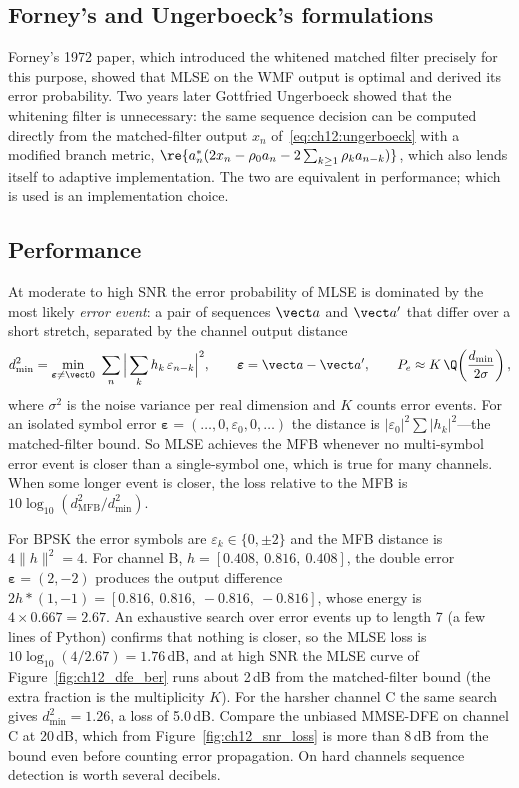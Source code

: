\subsection{Forney's and Ungerboeck's formulations}

Forney's 1972 paper, which introduced the whitened matched filter precisely for this purpose,
showed that MLSE on the WMF output is optimal and derived its error probability. Two years later
Gottfried Ungerboeck showed that the whitening filter is unnecessary: the same sequence decision can
be computed directly from the matched-filter output $x_n$ of~\eqref{eq:ch12:ungerboeck} with a modified
branch metric, $\re\{a_n^*(2x_n-\rho_0a_n-2\sum_{k\ge1}\rho_ka_{n-k})\}$, which also lends itself to
adaptive implementation. The two are equivalent in performance; which is used is an implementation
choice.

\subsection{Performance}

At moderate to high SNR the error probability of MLSE is dominated by the most likely
\emph{error event}: a pair of sequences $\vect a$ and $\vect a'$ that differ over a short stretch,
separated by the channel output distance
\begin{equation}
d^2_{\min}=\min_{\boldsymbol\varepsilon\ne\vect 0}\ \sum_n\Big|\sum_k h_k\,\varepsilon_{n-k}\Big|^2,
\qquad \boldsymbol\varepsilon=\vect a-\vect a',
\qquad P_e\approx K\,\Q\!\left(\frac{d_{\min}}{2\sigma}\right),
\label{eq:ch12:dmin}
\end{equation}
where $\sigma^2$ is the noise variance per real dimension and $K$ counts error events. For an
isolated symbol error $\boldsymbol\varepsilon=(\dots,0,\varepsilon_0,0,\dots)$ the distance is
$|\varepsilon_0|^2\sum|h_k|^2$---the matched-filter bound. So MLSE achieves the MFB whenever no
multi-symbol error event is closer than a single-symbol one, which is true for many channels. When
some longer event is closer, the loss relative to the MFB is $10\log_{10}(d^2_{\mathrm{MFB}}/d^2_{\min})$.

\begin{worked}
For BPSK the error symbols are $\varepsilon_k\in\{0,\pm2\}$ and the MFB distance is $4\|h\|^2=4$.
For channel B, $h=[0.408,\ 0.816,\ 0.408]$, the double error $\boldsymbol\varepsilon=(2,-2)$ produces
the output difference $2h*(1,-1)=[0.816,\ 0.816,\ -0.816,\ -0.816]$, whose energy is $4\times0.667=2.67$.
An exhaustive search over error events up to length 7 (a few lines of Python) confirms that nothing
is closer, so the MLSE loss is $10\log_{10}(4/2.67)=1.76$\,dB, and at high SNR the MLSE curve of
Figure~\ref{fig:ch12_dfe_ber} runs about 2\,dB from the matched-filter bound (the extra fraction is the
multiplicity $K$). For the harsher channel C the same search gives $d^2_{\min}=1.26$, a loss of 5.0\,dB.
Compare the unbiased MMSE-DFE on channel C at 20\,dB, which from Figure~\ref{fig:ch12_snr_loss} is more
than 8\,dB from the bound even before counting error propagation. On hard channels sequence detection is worth
several decibels.
\end{worked}

